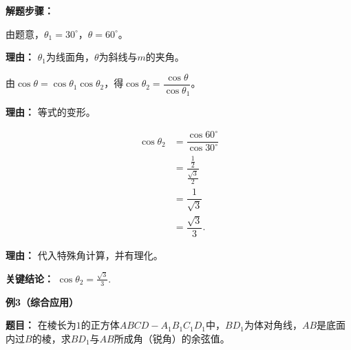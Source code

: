 \begin{examplebox}
	\textbf{\textcolor{CExample}{解题步骤：}}
	\begin{description}[style=nextline, leftmargin=2.8em, labelsep=0.5em, itemsep=0.45em]
		\item[\textbf{第一步（识别已知角）：}] 由题意，$\theta_1 = 30^{\circ}$，$\theta = 60^{\circ}$。
			\par\textbf{理由：} $\theta_1$为线面角，$\theta$为斜线与$m$的夹角。
		\item[\textbf{第二步（变形公式）：}] 由$\cos\theta = \cos\theta_1\cos\theta_2$，得$\cos\theta_2 = \dfrac{\cos\theta}{\cos\theta_1}$。
			\par\textbf{理由：} 等式的变形。
		\item[\textbf{第三步（代入求值）：}] \par
			\[
				\begin{aligned}
					\cos\theta_2 &= \dfrac{\cos60^{\circ}}{\cos30^{\circ}} \\
					&= \dfrac{\frac{1}{2}}{\frac{\sqrt{3}}{2}} \\
					&= \dfrac{1}{\sqrt{3}} \\
					&= \dfrac{\sqrt{3}}{3}.
			\end{aligned}
			\]
			\par\textbf{理由：} 代入特殊角计算，并有理化。
	\end{description}

	\textbf{\textcolor{CExample}{关键结论：}}
	$\cos\theta_2 = \frac{\sqrt{3}}{3}$.

	\medskip
	\textbf{\textcolor{CExample}{例3（综合应用）}}

	\textbf{\textcolor{CExample}{题目：}}
	在棱长为$1$的正方体$ABCD-A_1B_1C_1D_1$中，$BD_1$为体对角线，$AB$是底面内过$B$的棱，求$BD_1$与$AB$所成角（锐角）的余弦值。


\end{examplebox}
